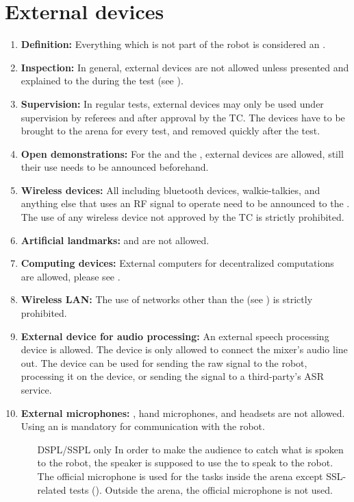 \section{External devices}\label{rule:roobt_external_devices}
\begin{enumerate}
	\item \textbf{Definition:} Everything which is not part of the robot is considered an . 
	\item \textbf{Inspection:} In general, external devices are not allowed unless presented and explained to the  during the  test (see ).
	\item \textbf{Supervision:} In regular tests, external devices may only be used under supervision by referees and after approval by the TC. The devices have to be brought to the arena for every test, and removed quickly after the test.
	\item \textbf{Open demonstrations:} For the  and the , external devices are allowed, still their use needs to be announced beforehand.
	\item \textbf{Wireless devices:} All  including bluetooth devices, walkie-talkies, and anything else that uses an RF signal to operate need to be announced to the . The use of any wireless device not approved by the TC is strictly prohibited.  
	\item \textbf{Artificial landmarks:}  and  are not allowed.
	\item \textbf{Computing devices:} External computers for decentralized computations are allowed, please see .
	\item \textbf{Wireless LAN:} The use of networks other than the  (see ) is strictly prohibited.
	\item \textbf{External device for audio processing: }An external speech processing device is allowed. The device is only allowed to connect the mixer's audio line out. The device can be used for sending the raw signal to the robot, processing it on the device, or sending the signal to a third-party's ASR service.
	\item \textbf{External microphones: }, hand microphones, and headsets are not allowed. Using an  is mandatory for communication with the robot. 
	\begin{itemize}
	\item [DSPL/SSPL only] In order to make the audience to catch what is spoken to the robot, the speaker is supposed to use the  to speak to the robot. The official microphone is used for the tasks inside the arena except SSL-related tests (). Outside the arena, the official microphone is not used.
	\end{itemize}
\end{enumerate}



